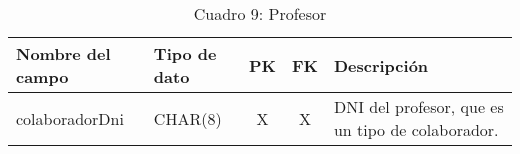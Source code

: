 \begin{table}[H]
	\centering
	\begin{tabular}{|l|l|c|c|l|}
		\hline
		\textbf{Nombre del campo} & \textbf{Tipo de dato} & \textbf{PK} & \textbf{FK} & \textbf{Descripción}                             \\
		\hline
		colaboradorDni            & CHAR(8)               & X           & X           & DNI del profesor, que es un tipo de colaborador. \\
		\hline
	\end{tabular}
	\caption{Cuadro 9: Profesor}
\end{table}